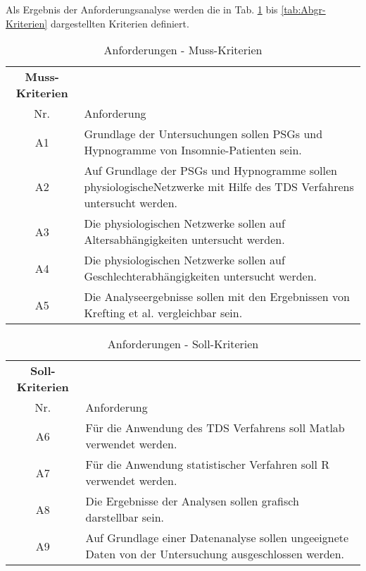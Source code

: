 Als Ergebnis der Anforderungsanalyse werden die in Tab. \ref{tab:Muss-Kriterien} bis \ref{tab:Abgr-Kriterien} dargestellten Kriterien definiert.\\

\begin{table}[H] 
\begin{tabularx}{\textwidth}{cllX}
\toprule
\multicolumn{3}{c}{\textbf{Muss-Kriterien}} & \\  
\cmidrule{1-3}
\multicolumn{3}{c}{Nr.} & Anforderung\\ 
\midrule 
\multicolumn{3}{c}{A1} &  Grundlage der Untersuchungen sollen \acs{PSG}s und Hypnogramme von Insomnie-Patienten sein.\\
\multicolumn{3}{c}{A2} & Auf Grundlage der \acs{PSG}s und Hypnogramme sollen physiologische\newline Netzwerke mit Hilfe des \acs{TDS} Verfahrens untersucht werden.\\
\multicolumn{3}{c}{A3} & Die physiologischen Netzwerke sollen auf Altersabhängigkeiten untersucht werden.\\ 
\multicolumn{3}{c}{A4} & Die physiologischen Netzwerke sollen auf Geschlechterabhängigkeiten untersucht werden.\\
\multicolumn{3}{c}{A5} & Die Analyseergebnisse sollen mit den Ergebnissen von Krefting et al. \parencite{krefting_age_2017} vergleichbar sein.\\
\bottomrule
\end{tabularx}
\caption{Anforderungen - Muss-Kriterien}
\label{tab:Muss-Kriterien}
\end{table}


\begin{table}[H] 
\begin{tabularx}{\textwidth}{cllX}
\toprule
\multicolumn{3}{c}{\textbf{Soll-Kriterien}} & \\  
\cmidrule{1-3}
\multicolumn{3}{c}{Nr.} & Anforderung\\ 
\midrule 
\multicolumn{3}{c}{A6} &  Für die Anwendung des \acs{TDS} Verfahrens soll Matlab verwendet werden.\\
\multicolumn{3}{c}{A7} & Für die Anwendung statistischer Verfahren soll R verwendet werden.\\
\multicolumn{3}{c}{A8} & Die Ergebnisse der Analysen sollen grafisch darstellbar sein.\\ 
\multicolumn{3}{c}{A9} & Auf Grundlage einer Datenanalyse sollen ungeeignete Daten von der Untersuchung ausgeschlossen werden.\\
\bottomrule
\end{tabularx}
\caption{Anforderungen - Soll-Kriterien}
\label{tab:Soll-Kriterien}
\end{table}


